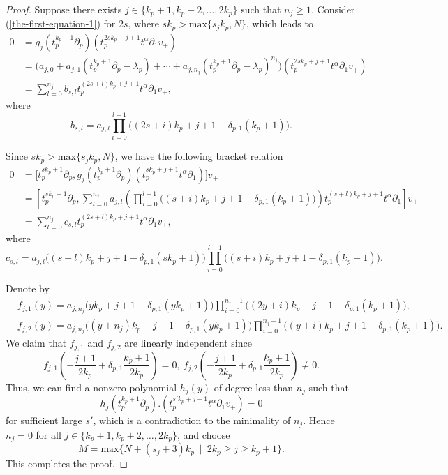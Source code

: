 \documentclass[12pt, a4paper]{amsart}
\theoremstyle{Theorem}
\theoremstyle{Theorem}
\numberwithin{equation}{section}
\begin{document}
\begin{proof}
	Suppose there exists $j\in\{k_p+1,k_p+2,\dots,2k_p\}$ such that $n_{j}\geq1$. Consider (\ref{the-first-equation-1})
	for $2s$, where $sk_p> \text{max}\{s_{j}k_p,N\} $, which leads to
	\begin{align*}
	0&=g_{j}(t_{p}^{k_p+1}\partial_{p})(t_{p}^{2s{k_p}+j+1}t^{\alpha}\partial_{1}v_+)\\
	&=\big(a_{j,0}+a_{j,1}\left(t_{p}^{k_p+1}\partial_{p}-\lambda_{p}\right)+\cdots+a_{j,n_{j}}\left(t_{p}^{k_p+1}\partial_{p}-\lambda_{p}\right)^{n_{j}}\big) (t_{p}^{2sk_p+j+1}t^{\alpha}\partial_{1}v_+)\\
	&=\sum_{l=0}^{n_{j}}b_{s,l}t_p^{(2s+l)k_p+j+1}t^{\alpha}\partial_1v_+,
\end{align*}
where
\begin{equation*}
	b_{s,l}=a_{j,l}\prod_{i=0}^{l-1}\big((2s+i)k_p+j+1-\delta_{p,1}(k_p+1)\big).
\end{equation*}
	
	Since $sk_p> \text{max}\{s_{j}k_p,N\} $, we have the following bracket relation 
	\begin{align*}
	0 &=\big[t_{p}^{sk_p + 1}\partial_{p},g_{j}(t_{p}^{k_p + 1}\partial_{p})(t_{p}^{sk_p + j + 1}t^{\alpha}\partial_{1})\big]v_+\\
	&=\left[t_{p}^{sk_p + 1}\partial_{p},\sum_{l=0}^{n_{j}}a_{j,l}\left(\prod_{i=0}^{l-1}\big((s+i)k_p+j+1-\delta_{p,1}(k_p+1)\big) \right )t_p^{(s+l)k_p+j+1}t^{\alpha}\partial_1\right]v_+\\
	&=\sum_{l=0}^{n_{j}}c_{s,l}t_p^{(2s+l)k_p+j+1}t^{\alpha}\partial_1v_+,
\end{align*}
where
\begin{equation*}
	c_{s,l}=a_{j,l}\big((s+l)k_p+j+1-\delta_{p,1}(sk_p+1)\big)\prod_{i=0}^{l-1}\big((s+i)k_p+j+1-\delta_{p,1}(k_p+1)\big).
\end{equation*}
	
		Denote by
	\begin{align*}
		&f_{j,1}(y)=a_{j,n_j}\big(yk_p+j+1-\delta_{p,1}(yk_p+1)\big)\prod_{i=0}^{n_{j}-1}\big((2y+i)k_p+j+1-\delta_{p,1}(k_p+1)\big),\\
		&f_{j,2}(y)=a_{j,n_j}\big((y+n_j)k_p+j+1-\delta_{p,1}(yk_p+1)\big)\prod_{i=0}^{n_{j}-1}\big((y+i)k_p+j+1-\delta_{p,1}(k_p+1)\big).
	\end{align*}
	We claim that $f_{j,1}$ and $f_{j,2}$ are linearly independent since
\begin{equation*}
	f_{j,1}\left(-\frac{j+1}{2k_p}+\delta_{p,1}\frac{k_p+1}{2k_p}\right)=0,~	f_{j,2}\left(-\frac{j+1}{2k_p}+\delta_{p,1}\frac{k_p+1}{2k_p}\right)\neq0.
\end{equation*}
	Thus, we can find a nonzero polynomial $h_{j}(y)$ of degree less than $n_{j}$ such that
	\[h_{j}(t_{p}^{k_p+1}\partial_{p}).(t_{p}^{s'k_p+j+1}t^{\alpha}\partial_{1}v_+)=0\]
	for sufficient large $s'$, which is a contradiction to the minimality of $n_{j}$. Hence $n_{j}=0$ for all
	$j\in\{k_p+1,k_p+2,\dots,2k_p\}$, and choose 
	\begin{equation*} 
		M=\text{max}\{N+(s_j+3)k_p \ \mid \  2k_p \geq  j \geq k_p+1 \}.
	\end{equation*}This completes the proof.
\end{proof}
\end{document}
